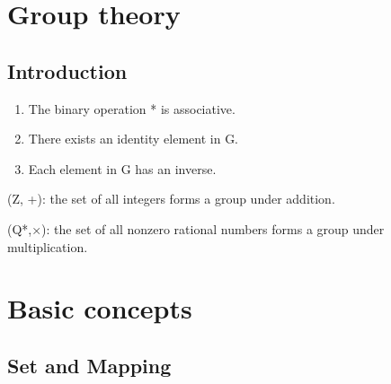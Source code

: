 \documentclass[cn,10pt,math=newtx,citestyle=gb7714-2015,bibstyle=gb7714-2015]{elegantbook}
\subtitle{}%
\title{}%
\author{}%
\date{\today}%
\begin{document}
	\makeatletter
	\frontmatter
	\newpage
	\tableofcontents
	\mainmatter
	
\chapter{Group theory} 

\section{Introduction}

\begin{definition}[Group]
	\quad
	\begin{enumerate}
		\item The binary operation * is associative.
		\item There exists an identity element in G.
		\item Each element in G has an inverse.
	\end{enumerate}
\end{definition}

\begin{example}
	(Z, +): the set of all integers forms a 
group 
under 
addition.
\end{example}
\begin{example}
	(Q*,×): the 
set of all 
nonzero 
rational 
numbers forms a group under multiplication.
\end{example}

\chapter{Basic concepts}

\section{\textbf{Set and Mapping}}
\end{document}
